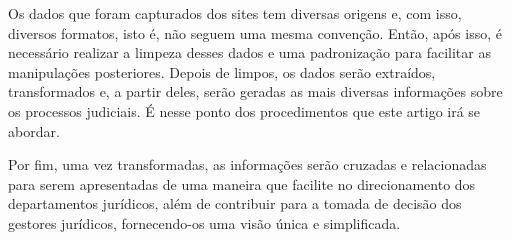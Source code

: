Os dados que foram capturados dos sites tem diversas origens e, com isso, diversos formatos, isto é, não seguem uma mesma convenção. Então, após isso, é necessário realizar a limpeza desses dados e uma padronização para facilitar as manipulações posteriores. Depois de limpos, os dados serão extraídos, transformados e, a partir deles, serão geradas as mais diversas informações sobre os processos judiciais. É nesse ponto dos procedimentos que este artigo irá se abordar.

Por fim, uma vez transformadas, as informações serão cruzadas e relacionadas para serem apresentadas de uma maneira que facilite no direcionamento dos departamentos jurídicos, além de contribuir para a tomada de decisão dos gestores jurídicos, fornecendo-os uma visão única e simplificada.





